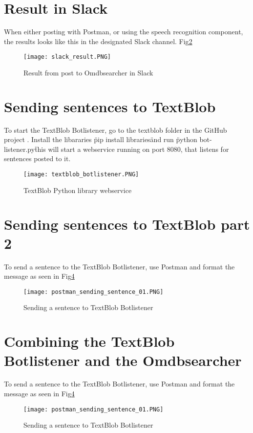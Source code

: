 \documentclass[11pt,fleqn]{book} %
\begin{document}
\newpage
\section{Result in Slack}
When either posting with Postman, or using the speech recognition component, the results looks like this in the designated Slack channel. Fig\ref{fig:slack-result}

\begin{figure}[]
  \centering
   \texttt{[image: slack\_result.PNG]}
  \caption{Result from post to Omdbsearcher in Slack}
  \label{fig:slack-result}
\end{figure}

\newpage
\section{Sending sentences to TextBlob}
To start the TextBlob Botlistener, go to the textblob folder in the GitHub project \cite{Github2017GitHubProject}. Install the libararies \"pip install libraries\" and run \"python bot-listener.py\" this will start a webservice running on port 8080, that listens for sentences posted to it.
\begin{figure}[]
  \centering
   \texttt{[image: textblob\_botlistener.PNG]}
  \caption{TextBlob Python library webservice}
  \label{fig:slack-result}
\end{figure}

\newpage
\section{Sending sentences to TextBlob part 2}
To send a sentence to the TextBlob Botlistener, use Postman and format the message as seen in Fig\ref{fig:sending-botlistener}
\begin{figure}[]
  \centering
   \texttt{[image: postman\_sending\_sentence\_01.PNG]}
  \caption{Sending a sentence to TextBlob Botlistener}
  \label{fig:sending-botlistener}
\end{figure}

\newpage
\section{Combining the TextBlob Botlistener and the Omdbsearcher}
To send a sentence to the TextBlob Botlistener, use Postman and format the message as seen in Fig\ref{fig:sending-botlistener}
\begin{figure}[]
  \centering
   \texttt{[image: postman\_sending\_sentence\_01.PNG]}
  \caption{Sending a sentence to TextBlob Botlistener}
  \label{fig:sending-botlistener}
\end{figure}
\end{document}
